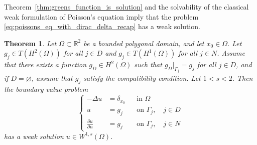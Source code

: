 \documentclass[english, 12pt, a4paper, sci, utf8, a-2b, online]{aaltothesis}
\theoremstyle{definition}
\theoremstyle{plain}
\newtheorem{theorem}{Theorem}[section]
\numberwithin{equation}{section}
\begin{document}
Theorem~\ref{thm:greens_function_is_solution} and the solvability of
the classical weak formulation of Poisson's equation imply that the problem
\eqref{eq:poissons_eq_with_dirac_delta_recap} has a weak solution.
\begin{theorem}
    \label{thm:dirac_load_is_solvable}
    Let $\Omega \subset \mathbb{R}^2$ be a bounded polygonal domain,
    and let $x_0 \in \Omega$.
    Let $g_j \in T(H^2(\Omega))$ for all $j \in D$ and $g_j \in T(H^1(\Omega))$
    for all $j \in N$. Assume that there exists a function $g_D \in H^2(\Omega)$
    such that $g_D|_{\Gamma_j} = g_j$ for all $j \in D$, and if $D = \varnothing$,
    assume that $g_j$ satisfy the compatibility condition.
    Let $1 < s < 2$. Then the boundary value problem
    \begin{equation}
        \label{eq:dirac_load_is_solvable_problem}
        \left\{
            \begin{aligned}
                -\Delta u &= \delta_{x_0} && \text{in } \Omega \\
                u &= g_j && \text{on } \Gamma_j, \quad j \in D \\
                \frac{\partial u}{\partial n} &= g_j && \text{on } \Gamma_j,
                \quad j \in N
            \end{aligned}
        \right.
    \end{equation}
    has a weak solution $u \in W^{1,s}(\Omega)$.
\end{theorem}
\end{document}
